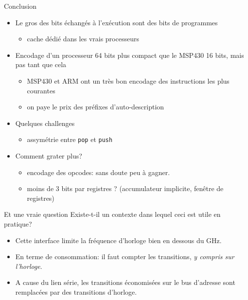 \documentclass[slidetop,11pt,table]{beamer}
\begin{document}
\begin{frame}{Conclusion}
  \begin{itemize}
  \item Le gros des bits échangés à l'exécution sont des bits de programmes
    \begin{itemize}
    \item cache dédié dans les vrais processeurs
    \end{itemize}
  \item Encodage d'un processeur 64 bits plus compact que le MSP430 16 bits, mais pas tant que cela
    \begin{itemize}
    \item MSP430 et ARM ont un très bon encodage des instructions les plus courantes
    \item on paye le prix des préfixes d'auto-description
    \end{itemize}
  \item Quelques challenges
    \begin{itemize}
    \item assymétrie entre \texttt{pop} et \texttt{push}
    \end{itemize}
  \item Comment grater plus?
    \begin{itemize}
    \item encodage des opcodes: sans doute peu à gagner.
    \item moins de 3 bits par registres ? (accumulateur implicite, fenêtre de registres)
    \end{itemize}
  \end{itemize}

\end{frame}



\begin{frame}{Et une vraie question}
  Existe-t-il un contexte dans lequel ceci est utile en pratique?
  \begin{itemize}
  \item Cette interface limite la fréquence d'horloge bien en dessous du GHz.
  \item En terme de consommation: il faut compter les transitions, \emph{y compris sur l'horloge}.
  
  \item A cause du lien série, les transitions économisées sur le bus d'adresse sont remplacées par  des transitions d'horloge. 
  \end{itemize}

  
\end{frame}
\end{document}
